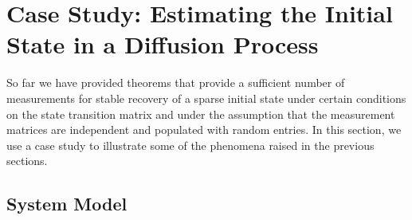 \documentclass[11pt,draftcls,onecolumn]{IEEEtran}
\begin{document}
\section{Case Study: Estimating the Initial State in a Diffusion Process}
\label{sec:expt}

So far we have provided theorems that provide a sufficient number of measurements for stable recovery of a sparse initial state under certain conditions on the state transition matrix and under the assumption that the measurement matrices are independent and populated with random entries. In this section, we use a case study to illustrate some of the phenomena raised in the previous sections.
\subsection{System Model}
\end{document}
